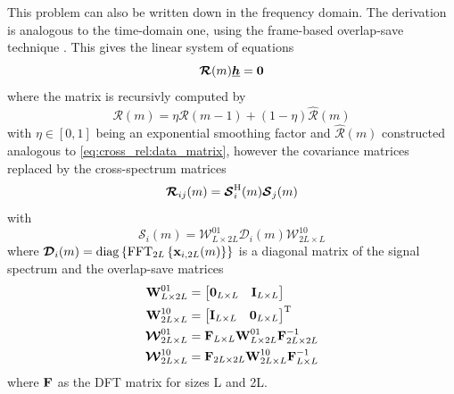 \documentclass{article}
\newcommand{\x}{\mtxb{x}}
\newcommand{\R}{\mtxb{R}}
\newcommand{\hf}{\underline{\bm{h}}}
\newcommand{\Rf}{\bm{\mathcal{R}}}
\begin{document}

This problem can also be written down in the frequency domain.
The derivation is analogous to the time-domain one, using the frame-based overlap-save technique \cite{}.
This gives the linear system of equations 
\begin{equation}
    \Rf(m) \hf = \bm{0} \label{eq:frequency_domain:null_space}\\
\end{equation}
where the matrix is recursivly computed by \begin{equation}
    \Rf(m) = \eta \Rf(m-1) + (1-\eta )\hat{\Rf}(m)
\end{equation}
with \(\eta \in [0,1]\) being an exponential smoothing factor and \(\hat{\Rf}(m)\) constructed analogous to \eqref{eq:cross_rel:data_matrix}, however the covariance matrices replaced by the cross-spectrum matrices 
\begin{equation}
    \Rf_{ij}(m) = \bm{\mathcal{S}}_{i}^\herm (m) \bm{\mathcal{S}}_{j}(m)
\end{equation}
with 
\begin{equation}
    \bm{\mathcal{S}}_{i}(m) = \bm{\mathcal{W}}^{01}_{L \times 2L} \bm{\mathcal{D}}_{i}(m) \bm{\mathcal{W}}^{10}_{2L \times L}
\end{equation}
where \(\bm{\mathcal{D}}_{i}(m) = \operatorname{diag} \left\{ \operatorname{FFT}_{2L} \left\{ \x_{i,2L}(m) \right\} \right\}\) is a diagonal matrix of the signal spectrum and the overlap-save matrices
\begin{align}
    \bm{\mathrm{W}}_{L \times 2L}^{01} &= \begin{bmatrix}
        \bm{\mathrm{0}}_{L \times L} & \bm{\mathrm{I}}_{L \times L}
    \end{bmatrix}\\
    \bm{\mathrm{W}}_{2L \times L}^{10} &= \begin{bmatrix}
        \bm{\mathrm{I}}_{L \times L} & \bm{\mathrm{0}}_{L \times L}
    \end{bmatrix}^{\mathrm{T}}\\
    \bm{\mathcal{W}}_{2L \times L}^{01} &= \bm{\mathrm{F}}_{L \times L} \bm{\mathrm{W}}_{L \times 2L}^{01} \bm{\mathrm{F}}_{2L \times 2L}^{-1}\\
    \bm{\mathcal{W}}_{2L \times L}^{10} &= \bm{\mathrm{F}}_{2L \times 2L} \bm{\mathrm{W}}_{2L \times L}^{10} \bm{\mathrm{F}}_{L \times L}^{-1}
\end{align} where $\bm{\mathrm{F}}$ as the DFT matrix for sizes L and 2L.
\end{document}
